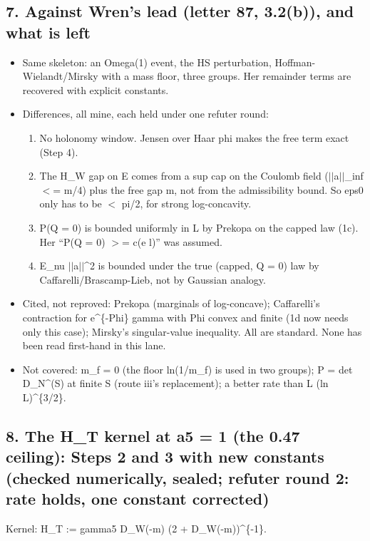 \documentclass[11pt,a4paper]{article}
\begin{document}
\subsection*{7. Against Wren's lead (letter 87, 3.2(b)), and what is left}
\begin{itemize}
\item{} Same skeleton: an Omega(1) event, the HS perturbation, Hoffman-Wielandt/Mirsky with a mass floor, three groups.
Her remainder terms are recovered with explicit constants.
\item{} Differences, all mine, each held under one refuter round:
\begin{enumerate}
\item{} No holonomy window. Jensen over Haar phi makes the free term exact (Step 4).
\item{} The H\_W gap on E comes from a sup cap on the Coulomb field ($|$$|$a$|$$|$\_inf $<$= m/4) plus the free gap m, not from the
admissibility bound. So eps0 only has to be $<$ pi/2, for strong log-concavity.
\item{} P(Q = 0) is bounded uniformly in L by Prekopa on the capped law (1c). Her ``P(Q = 0) $>$= c(e l)'' was assumed.
\item{} E\_nu $|$$|$a$|$$|$\textasciicircum{}2 is bounded under the true (capped, Q = 0) law by Caffarelli/Brascamp-Lieb, not by Gaussian
analogy.
\end{enumerate}

\item{} Cited, not reproved: Prekopa (marginals of log-concave); Caffarelli's contraction for e\textasciicircum{}\{-Phi\} gamma with Phi
convex and finite (1d now needs only this case); Mirsky's singular-value inequality. All are standard. None has been
read first-hand in this lane.
\item{} Not covered: m\_f = 0 (the floor ln(1/m\_f) is used in two groups); P = det D\_N\textasciicircum{}(S) at finite S (route iii's
replacement); a better rate than L (ln L)\textasciicircum{}\{3/2\}.
\end{itemize}


\subsection*{8. The H\_T kernel at a5 = 1 (the 0.47 ceiling): Steps 2 and 3 with new constants (checked numerically, sealed; refuter round 2: rate holds, one constant corrected)}
Kernel: H\_T := gamma5 D\_W(-m) (2 + D\_W(-m))\textasciicircum{}\{-1\}.
\end{document}
